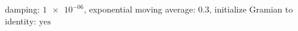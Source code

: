 damping: $\num[scientific-notation=true]{1e-06}$, exponential moving average: $\num[scientific-notation=true]{0.3}$, initialize Gramian to identity: $\text{yes}$
